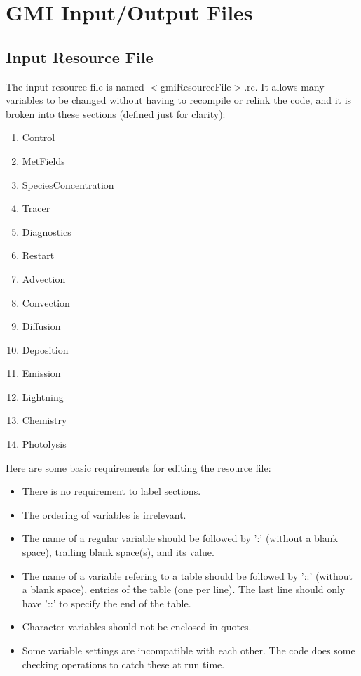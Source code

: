 \chapter[GMI Files]{GMI Input/Output Files} \label{chap:files}

%
\section{Input Resource File}
%
The input resource file is named $<$gmiResourceFile$>$.rc.
It allows many variables to be changed without having to
recompile or relink the code, and it is broken into these sections
(defined just for clarity):
%
\begin{enumerate}
\item Control
\item MetFields
\item SpeciesConcentration
\item Tracer
\item Diagnostics
\item Restart
\item Advection
\item Convection
\item Diffusion
\item Deposition
\item Emission
\item Lightning
\item Chemistry
\item Photolysis
\end{enumerate}
%
Here are some basic requirements for editing the resource file:
%
\begin{itemize}
\item There is no requirement to label sections.
\item The ordering of variables is irrelevant.
\item The name of a regular variable should be followed by ':' (without a blank space),
      trailing blank space(s), and its value.
\item The name of a variable refering to a table should be followed by '::' 
      (without a blank space), entries of the table (one per line). 
      The last line should only have '::' to specify the end of the table.
\item Character variables should not be enclosed in quotes.
\item Some variable settings are incompatible with each other.
      The code does some checking operations to catch these at run time.
\end{itemize}
%

